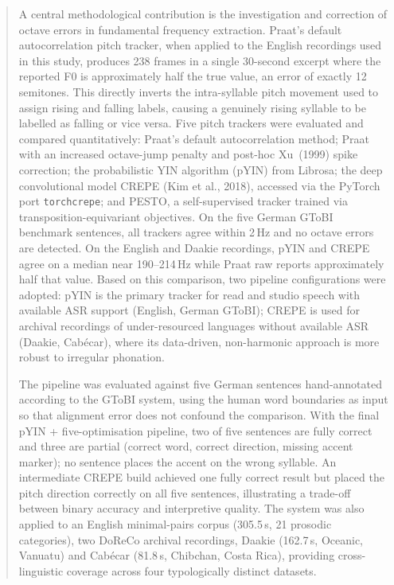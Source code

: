 \begin{abstract}
A central methodological contribution is the investigation and correction of octave errors in fundamental frequency extraction. Praat's default autocorrelation pitch tracker, when applied to the English recordings used in this study, produces 238 frames in a single 30-second excerpt where the reported F0 is approximately half the true value, an error of exactly 12 semitones. This directly inverts the intra-syllable pitch movement used to assign rising and falling labels, causing a genuinely rising syllable to be labelled as falling or vice versa. Five pitch trackers were evaluated and compared quantitatively: Praat's default autocorrelation method; Praat with an increased octave-jump penalty and post-hoc Xu~(1999) spike correction; the probabilistic YIN algorithm (pYIN) from Librosa; the deep convolutional model CREPE (Kim et al., 2018), accessed via the PyTorch port \texttt{torchcrepe}; and PESTO, a self-supervised tracker trained via transposition-equivariant objectives. On the five German GToBI benchmark sentences, all trackers agree within 2\,Hz and no octave errors are detected. On the English and Daakie recordings, pYIN and CREPE agree on a median near 190--214\,Hz while Praat raw reports approximately half that value. Based on this comparison, two pipeline configurations were adopted: pYIN is the primary tracker for read and studio speech with available ASR support (English, German GToBI); CREPE is used for archival recordings of under-resourced languages without available ASR (Daakie, Cabécar), where its data-driven, non-harmonic approach is more robust to irregular phonation.

The pipeline was evaluated against five German sentences hand-annotated according to the GToBI system, using the human word boundaries as input so that alignment error does not confound the comparison. With the final pYIN + five-optimisation pipeline, two of five sentences are fully correct and three are partial (correct word, correct direction, missing accent marker); no sentence places the accent on the wrong syllable. An intermediate CREPE build achieved one fully correct result but placed the pitch direction correctly on all five sentences, illustrating a trade-off between binary accuracy and interpretive quality. The system was also applied to an English minimal-pairs corpus (305.5\,s, 21 prosodic categories), two DoReCo archival recordings, Daakie (162.7\,s, Oceanic, Vanuatu) and Cabécar (81.8\,s, Chibchan, Costa Rica), providing cross-linguistic coverage across four typologically distinct datasets.


\end{abstract}

